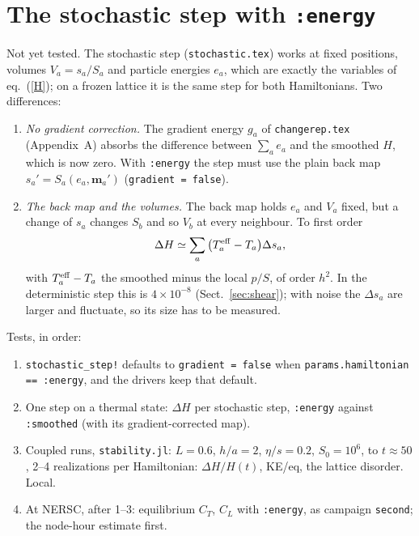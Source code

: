 \documentclass[11pt,aps,preprint,nofootinbib,superscriptaddress,tightenlines]{revtex4-2}
\def\st{\begin{equation}}
\def\stp{\end{equation}}
\def\Eq#1{eq.~(\ref{#1})}
\def\Sect#1{Sect.~\ref{#1}}
\begin{document}
\section{The stochastic step with \texttt{:energy}}
\label{sec:stoch}

Not yet tested.  The stochastic step (\texttt{stochastic.tex}) works at fixed positions,
volumes $V_a=s_a/S_a$ and particle energies $e_a$, which are exactly the variables of
\Eq{H}; on a frozen lattice it is the same step for both Hamiltonians.  Two differences:
\begin{enumerate}
\item \emph{No gradient correction.}  The gradient energy $g_a$ of \texttt{changerep.tex}
  (Appendix~A) absorbs the difference between $\sum_ae_a$ and the smoothed $H$, which is
  now zero.  With \texttt{:energy} the step must use the plain back map
  $s_a'=S_a(e_a,\bm m_a')$ (\texttt{gradient = false}).
\item \emph{The back map and the volumes.}  The back map holds $e_a$ and $V_a$ fixed, but a
  change of $s_a$ changes $S_b$ and so $V_b$ at every neighbour.  To first order
  \st
  \Delta H\simeq\sum_a\big(T^{\rm eff}_a-T_a\big)\Delta s_a ,
  \stp
  with $T^{\rm eff}_a-T_a$ the smoothed minus the local $p/S$, of order $h^2$.  In the
  deterministic step this is $4\times10^{-8}$ (\Sect{sec:shear}); with noise the $\Delta s_a$
  are larger and fluctuate, so its size has to be measured.
\end{enumerate}
Tests, in order:
\begin{enumerate}
\item \texttt{stochastic\_step!} defaults to \texttt{gradient = false} when
  \texttt{params.hamiltonian == :energy}, and the drivers keep that default.
\item One step on a thermal state: $\Delta H$ per stochastic step, \texttt{:energy} against
  \texttt{:smoothed} (with its gradient-corrected map).
\item Coupled runs, \texttt{stability.jl}: $L=0.6$, $h/a=2$, $\eta/s=0.2$,
  $S_0=10^6$, to $t\approx50$, 2--4 realizations per Hamiltonian: $\Delta H/H(t)$,
  KE/eq, the lattice disorder.  Local.
\item At NERSC, after 1--3: equilibrium $C_T$, $C_L$ with \texttt{:energy}, as campaign
  \texttt{second}; the node-hour estimate first.
\end{enumerate}
\end{document}
